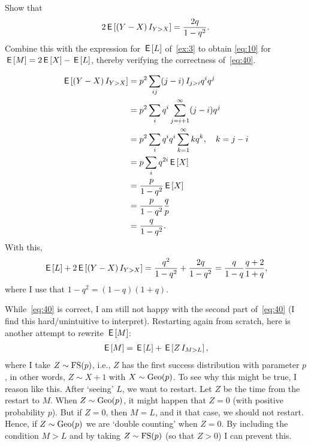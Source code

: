 \documentclass[a4paper,11pt]{article}
\begin{document}
\begin{exercise}\label{ex:9}
Show that 
\begin{equation}
  \label{eq:41}
2\,\mathsf{E}\left[(Y-X) \,I_{Y>X}\right] = \frac{2q} {1-q^{2}}.
\end{equation}
Combine this with the expression for $\,\mathsf{E}\left[L\right]$ of~\cref{ex:3} to obtain \cref{eq:10} for $\,\mathsf{E}\left[M\right] = 2\,\mathsf{E}\left[X\right] - \,\mathsf{E}\left[L\right]$, thereby verifying the correctness of~\cref{eq:40}. 
\begin{solution}
  \begin{align}
    \label{eq:42}
\,\mathsf{E}\left[(Y-X) \,I_{Y>X}\right] 
&= p^2\sum_{ij} (j-i)\,I_{j>i} q^iq^j\\
&= p^2\sum_{i} q^i\sum_{j=i+1}^{\infty}(j-i)q^j\\
&= p^2\sum_{i} q^i q^{i}\sum_{k=1}^{\infty}kq^k, \quad k = j-i\\
&= p\sum_{i}  q^{2i}\,\mathsf{E}\left[X\right] \\
&= \frac{p}{1-q^{2}}\,\mathsf{E}\left[X\right] \\
&= \frac{p}{1-q^{2}}\frac q p \\
&= \frac{q}{1-q^{2}}.
  \end{align}
With this, 
\begin{align}
  \label{eq:43}
\,\mathsf{E}\left[L\right] + 2  \,\mathsf{E}\left[(Y-X) \,I_{Y>X}\right] = \frac{q^{2}}{1-q^2} +  \frac{2q}{1-q^{2}} = \frac q{1-q}\frac{q+2}{1+q},
\end{align}
where I use that $1-q^{2}=(1-q)(1+q)$.
\end{solution}
\end{exercise}

While~\cref{eq:40} is correct, I am still not happy with the second part of~\eqref{eq:40} (I find this hard/unintuitive to interpret).
Restarting again from scratch, here is another attempt to rewrite $\,\mathsf{E}\left[M\right]$: 
\begin{align}
  \label{eq:44}
\,\mathsf{E}\left[M\right] = \,\mathsf{E}\left[L\right] + \,\mathsf{E}\left[ Z \,I_{M>L}\right],
\end{align}
where I take $Z\sim \mathrm{FS}(p)$, i.e., $Z$ has the first success distribution with parameter $p$, in other words, $Z \sim X+1$ with $X\sim\mathrm{Geo}(p)$.
To see why this might be true, I reason like this.
After `seeing' $L$, we want to restart.
Let $Z$ be the time from the restart to $M$.
When $Z\sim \mathrm{Geo}(p)$, it might happen that $Z=0$ (with positive probability $p$).
But if $Z=0$, then $M=L$, and it that case, we should not restart.
Hence, if $Z\sim \mathrm{Geo}(p)$ we are `double counting' when $Z=0$.
By including the condition $M>L$ and by taking $Z\sim\mathrm{FS}(p)$ (so that $Z>0$) I can prevent this.
\end{document}
